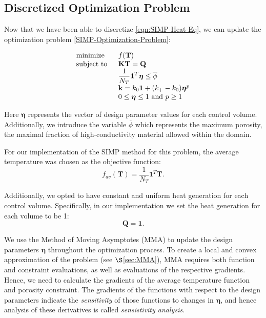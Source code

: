 \subsection{Discretized Optimization Problem}

Now that we have been able to discretize \eqref{eqn:SIMP-Heat-Eq}, we can update the optimization problem \eqref{SIMP-Optimization-Problem}:

\begin{equation}
	\begin{tabular}{ll}
		\text{minimize }   & $f(\mathbf{T})$                                                                                     \\
		\text{subject to } & $\mathbf{K}\mathbf{T}=\mathbf{Q}$                                                                   \\
		                   & $\displaystyle\frac{1}{N_T}\mathbf{1}^T\boldsymbol{\eta}\leq\overline{\phi}$ \\
		                   & $\mathbf{k}=k_0\mathbf{1}+(k_+-k_0)\boldsymbol{\eta}^p$                                       \\
		                   & $0\leq\boldsymbol{\eta}\leq 1\text{ and } p\geq 1$
	\end{tabular}\label{Discretized-SIMP-Optimization-Problem}
\end{equation}

Here $\boldsymbol{\eta}$ represents the vector of design parameter values for each control volume. Additionally, we introduce the variable $\overline{\phi}$ which represents the maximum porosity, the maximal fraction of high-conductivity material allowed within the domain.

For our implementation of the SIMP method for this problem, the average temperature was chosen as the objective function:
\begin{equation}
	f_{av}\left(\mathbf{T}\right)=\frac{1}{N_T}\mathbf{1}^T\mathbf{T}.\label{eqn:f_av}
\end{equation}

Additionally, we opted to have constant and uniform heat generation for each control volume. Specifically, in our implementation we set the heat generation for each volume to be 1:
\begin{equation}
	\mathbf{Q}=\mathbf{1}.\label{eqn:Q_vec}
\end{equation}

We use the Method of Moving Asymptotes (MMA) to update the design parameters $\boldsymbol{\eta}$ throughout the optimization process. To create a local and convex approximation of the problem (see $\S$\ref{sec:MMA}), MMA requires both function and constraint evaluations, as well as evaluations of the respective gradients. Hence, we need to calculate the gradients of the average temperature function and porosity constraint. The gradients of the functions with respect to the design parameters indicate the \textit{sensitivity} of those functions to changes in $\boldsymbol{\eta}$, and hence analysis of these derivatives is called \textit{sensistivity analysis}.

